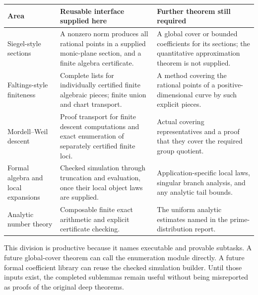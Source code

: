 \begin{longtable}{P{.20\linewidth}P{.38\linewidth}P{.32\linewidth}}
\toprule
Area & Reusable interface supplied here & Further theorem still required\\
\midrule\endhead
Siegel-style sections & A nonzero norm produces all rational points
in a supplied monic-plane section, and a finite algebra certificate. &
A global cover or bounded coefficients for its sections; the quantitative
approximation theorem is not supplied.\\[4pt]
Faltings-style finiteness & Complete lists for individually certified
finite algebraic pieces; finite union and chart transport. & A method
covering the rational points of a positive-dimensional curve by such
explicit pieces.\\[4pt]
Mordell--Weil descent & Proof transport for finite descent computations
and exact enumeration of separately certified finite loci. & Actual
covering representatives and a proof that they cover the required group
quotient.\\[4pt]
Formal algebra and local expansions & Checked simulation through
truncation and evaluation, once their local object laws are supplied. &
Application-specific local laws, singular branch analysis, and any
analytic tail bounds.\\[4pt]
Analytic number theory & Composable finite exact arithmetic and
explicit certificate checking. & The uniform analytic estimates named
in the prime-distribution report.\\
\bottomrule
\end{longtable}

This division is productive because it names executable and provable
subtasks. A future global-cover theorem can call the enumeration module
directly. A future formal coefficient library can reuse the checked
simulation builder. Until those inputs exist, the completed sublemmas
remain useful without being misreported as proofs of the original
deep theorems.
